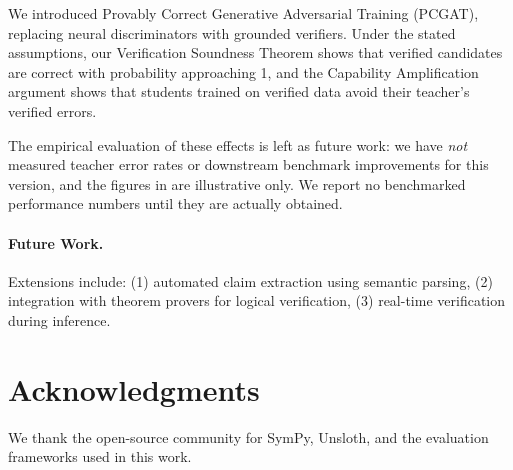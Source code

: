 \documentclass[11pt,a4paper]{article}
\begin{document}
We introduced Provably Correct Generative Adversarial Training (PCGAT), replacing neural discriminators with grounded verifiers. Under the stated assumptions, our Verification Soundness Theorem shows that verified candidates are correct with probability approaching 1, and the Capability Amplification argument shows that students trained on verified data avoid their teacher's verified errors.

The empirical evaluation of these effects is left as future work: we have \emph{not} measured teacher error rates or downstream benchmark improvements for this version, and the figures in  are illustrative only. We report no benchmarked performance numbers until they are actually obtained.

\paragraph{Future Work.}
Extensions include: (1) automated claim extraction using semantic parsing, (2) integration with theorem provers for logical verification, (3) real-time verification during inference.

\section*{Acknowledgments}

We thank the open-source community for SymPy, Unsloth, and the evaluation frameworks used in this work.
\end{document}
